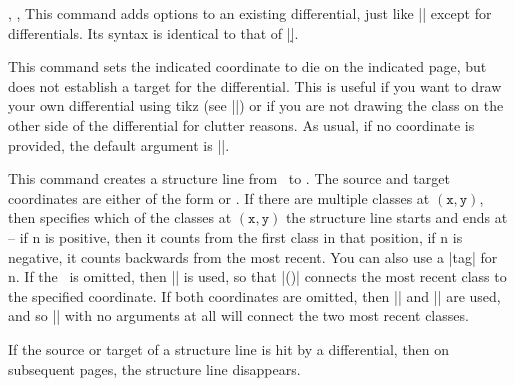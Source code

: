 \begin{sseqdata}[name = basic, cohomological Serre grading]
\begin{commandlist}{
    {\doptions\moptions{}},
    {\doptions\moptions{}\pars{\sourcename\opt{,\targetn}}},
    {\doptions\moptions{}\pars{\sourcecoord}\pars{\targetcoord}}%
}%
This command adds options to an existing differential, just like |\classoptions|
except for differentials. Its syntax is identical to that of |\d|.
\end{commandlist}

\begin{command}{\kill{}} This command sets the indicated
coordinate to die on the indicated page, but does not establish a target for the
differential. This is useful if you want to draw your own differential using
tikz (see |\getdtarget|) or if you are not drawing the class on the other side
of the differential for clutter reasons. As usual, if no coordinate is provided,
the default argument is |\lastclass|.
\end{command}

\begin{command}{\structline\ooptions\opt{\pars{\sourcecoord}\pars{\targetcoord}}}
This command creates a structure line from \sourcecoord\  to \targetcoord. The
source and target coordinates are either of the form
 or . If there are
multiple classes at $\mathtt{(x,y)}$, then  specifies which of the
classes at $\mathtt{(x,y)}$ the structure line starts and ends at -- if n is
positive, then it counts from the first class in that position, if n is
negative, it counts backwards from the most recent. You can also use a |tag| for
n. If the \targetcoord\ is omitted, then |\lastclass| is used, so that
|\structline(\sourcecoord)| connects the most recent class to the specified
coordinate. If both coordinates are omitted, then |\lastclass| and ||
are used, and so |\structline| with no arguments at all will connect the two
most recent classes.

If the source or target of a structure line is hit by a differential, then on
subsequent pages, the structure line disappears.


\end{command}
\end{sseqdata}
